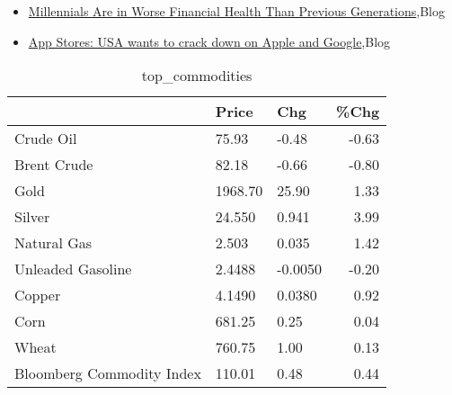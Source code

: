 \documentclass{article}%
\begin{document}
%
\begin{itemize}%
\item%
\href{https://reddit.com/r/Economics/comments/10rnfrz/millennials\_are\_in\_worse\_financial\_health\_than/}{Millennials Are in Worse Financial Health Than Previous Generations},Blog%
\item%
\href{https://reddit.com/r/Economics/comments/10rhsb3/app\_stores\_usa\_wants\_to\_crack\_down\_on\_apple\_and/}{App Stores: USA wants to crack down on Apple and Google},Blog%
\end{itemize}%


\begin{table}[htbp]%
\caption{top\_commodities}%
\centering%
\begin{adjustbox}{width=1\textwidth}%
\begin{tabular}{lllr}
\toprule
                          &   Price &     Chg &  \%Chg \\
\midrule
               Crude Oil  &   75.93 &   -0.48 & -0.63 \\
             Brent Crude  &   82.18 &   -0.66 & -0.80 \\
                    Gold  & 1968.70 &   25.90 &  1.33 \\
                  Silver  &  24.550 &   0.941 &  3.99 \\
             Natural Gas  &   2.503 &   0.035 &  1.42 \\
       Unleaded Gasoline  &  2.4488 & -0.0050 & -0.20 \\
                  Copper  &  4.1490 &  0.0380 &  0.92 \\
                    Corn  &  681.25 &    0.25 &  0.04 \\
                   Wheat  &  760.75 &    1.00 &  0.13 \\
Bloomberg Commodity Index &  110.01 &    0.48 &  0.44 \\
\bottomrule
\end{tabular}
%
\end{adjustbox}%
\end{table}

%
\end{document}
